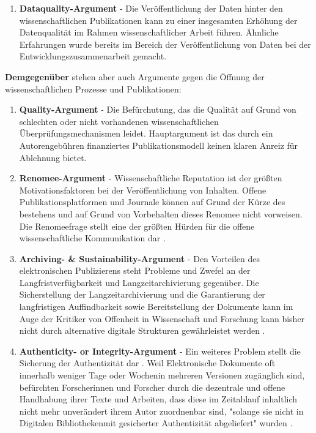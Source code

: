 \begin{enumerate}
\item \textbf{Dataquality-Argument} - Die Veröffentlichung der Daten hinter den wissenschaftlichen Publikationen kann zu einer insgesamten Erhöhung der Datenqualität im Rahmen wissenschaftlicher Arbeit führen. Ähnliche Erfahrungen wurde bereits im Bereich der Veröffentlichung von Daten bei der Entwicklungszusammenarbeit gemacht\cite{heise_2014_bundestag}.
\end{enumerate}

\textbf{Demgegenüber} stehen aber auch Argumente gegen die Öffnung der wissenschaftlichen Prozesse und Publikationen:
\begin{enumerate}
\item \textbf{Quality-Argument} - Die Befürchutung, das die Qualität auf Grund von schlechten oder nicht vorhandenen wissenschaftlichen Überprüfungsmechanismen leidet. Hauptargument ist das durch ein Autorengebühren finanziertes Publikationsmodell keinen klaren Anreiz für Ablehnung bietet.
\item \textbf{Renomee-Argument} - Wissenschaftliche Reputation ist der größten Motivationsfaktoren bei der Veröffentlichung von Inhalten. Offene Publikationsplatformen und Journale können auf Grund der Kürze des bestehens und auf Grund von Vorbehalten dieses Renomee nicht vorweisen. Die Renomeefrage stellt eine der größten Hürden für die offene wissenschaftliche Kommunikation dar \cite{weishaupt_2009_goldenOA}.
\item \textbf{Archiving- & Sustainability-Argument} - Den Vorteilen des elektronischen Publizierens steht Probleme und Zwefel an der Langfristverfügbarkeit und Langzeitarchivierung \cite{weishaupt_2009_goldenOA} gegenüber. Die Sicherstellung der Langzeitarchivierung und die Garantierung der langfristigen Auffindbarkeit sowie Bereitstellung der Dokumente kann im Auge der Kritiker von Offenheit in Wissenschaft und Forschung kann bisher nicht durch alternative digitale Strukturen gewährleistet werden \cite{umstatter_2007_qualitatssicherung}. 
\item \textbf{Authenticity- or Integrity-Argument} - Ein weiteres Problem stellt die Sicherung der Authentizität dar \cite{umstatter_2007_qualitatssicherung} \cite{weishaupt_2009_goldenOA}. Weil Elektronische Dokumente oft innerhalb weniger Tage oder Wochenin mehreren Versionen zugänglich sind, befürchten Forscherinnen und Forscher durch die dezentrale und offene Handhabung ihrer Texte und Arbeiten, dass diese im Zeitablauf inhaltlich nicht mehr unverändert ihrem Autor zuordnenbar sind, "solange sie nicht in Digitalen Bibliothekenmit gesicherter Authentizität abgeliefert" wurden \cite{umstatter_2007_qualitatssicherung}.

\end{enumerate}
